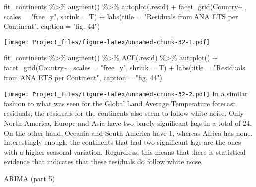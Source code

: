 \documentclass[
]{article}
\newenvironment{Shaded}{\begin{snugshade}}{\end{snugshade}}
\newcommand{\AttributeTok}[1]{\textcolor[rgb]{0.77,0.63,0.00}{#1}}
\newcommand{\FunctionTok}[1]{\textcolor[rgb]{0.00,0.00,0.00}{#1}}
\newcommand{\NormalTok}[1]{#1}
\newcommand{\SpecialCharTok}[1]{\textcolor[rgb]{0.00,0.00,0.00}{#1}}
\newcommand{\StringTok}[1]{\textcolor[rgb]{0.31,0.60,0.02}{#1}}
\begin{document}
\begin{Shaded}
\begin{Highlighting}[]
\NormalTok{fit\_continents }\SpecialCharTok{\%\textgreater{}\%} 
  \FunctionTok{augment}\NormalTok{() }\SpecialCharTok{\%\textgreater{}\%} 
  \FunctionTok{autoplot}\NormalTok{(.resid) }\SpecialCharTok{+} \FunctionTok{facet\_grid}\NormalTok{(Country}\SpecialCharTok{\textasciitilde{}}\NormalTok{., }\AttributeTok{scales =} \StringTok{"free\_y"}\NormalTok{, }\AttributeTok{shrink =}\NormalTok{ T) }\SpecialCharTok{+} \FunctionTok{labs}\NormalTok{(}\AttributeTok{title =} \StringTok{"Residuals from ANA ETS per Continent"}\NormalTok{, }\AttributeTok{caption =} \StringTok{"fig. 44"}\NormalTok{)}
\end{Highlighting}
\end{Shaded}

\texttt{[image: Project\_files/figure-latex/unnamed-chunk-32-1.pdf]}

\begin{Shaded}
\begin{Highlighting}[]
\NormalTok{fit\_continents }\SpecialCharTok{\%\textgreater{}\%} 
  \FunctionTok{augment}\NormalTok{() }\SpecialCharTok{\%\textgreater{}\%} 
  \FunctionTok{ACF}\NormalTok{(.resid) }\SpecialCharTok{\%\textgreater{}\%} 
  \FunctionTok{autoplot}\NormalTok{() }\SpecialCharTok{+} \FunctionTok{facet\_grid}\NormalTok{(Country}\SpecialCharTok{\textasciitilde{}}\NormalTok{., }\AttributeTok{scales =} \StringTok{"free\_y"}\NormalTok{, }\AttributeTok{shrink =}\NormalTok{ T) }\SpecialCharTok{+} \FunctionTok{labs}\NormalTok{(}\AttributeTok{title =} \StringTok{"Residuals from ANA ETS per Continent"}\NormalTok{, }\AttributeTok{caption =} \StringTok{"fig. 44"}\NormalTok{)}
\end{Highlighting}
\end{Shaded}

\texttt{[image: Project\_files/figure-latex/unnamed-chunk-32-2.pdf]} In a
similar fashion to what was seen for the Global Land Average Temperature
forecast residuals, the residuals for the continents also seem to follow
white noise. Only North America, Europe and Asia have two barely
significant lags in a total of 24. On the other hand, Oceania and South
America have 1, whereas Africa has none. Interestingly enough, the
continents that had two significant lags are the ones with a higher
seasonal variation. Regardless, this means that there is statistical
evidence that indicates that these residuals do follow white noise.

ARIMA (part 5)
\end{document}
